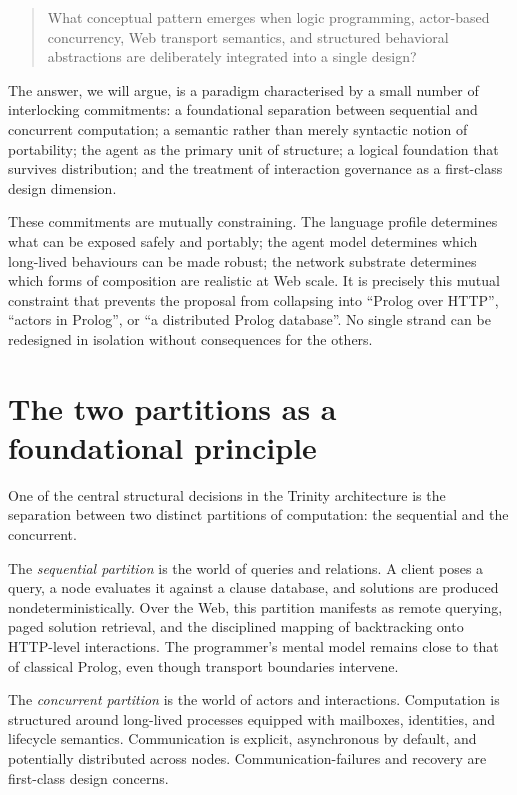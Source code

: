 \begin{quote}
\normalsize What conceptual pattern emerges when logic programming, actor-based concurrency, Web transport semantics, and structured behavioral abstractions are deliberately integrated into a single design?
\end{quote}

\noindent The answer, we will argue, is a paradigm characterised by a small number of interlocking commitments: a foundational separation between sequential and concurrent computation; a semantic rather than merely syntactic notion of portability; the agent as the primary unit of structure; a logical foundation that survives distribution; and the treatment of interaction governance as a first-class design dimension.

These commitments are mutually constraining. The language profile determines what can be exposed safely and portably; the agent model determines which long-lived behaviours can be made robust; the network substrate determines which forms of composition are realistic at Web scale. It is precisely this mutual constraint that prevents the proposal from collapsing into ``Prolog over HTTP'', ``actors in Prolog'', or ``a distributed Prolog database''. No single strand can be redesigned in isolation without consequences for the others.


\section{The two partitions as a foundational principle}\label{sec:two-partitions}

One of the central structural decisions in the Trinity architecture is
the separation between two distinct partitions of computation: the
sequential and the concurrent.

The \emph{sequential partition} is the world of queries and relations. A
client poses a query, a node evaluates it against a clause database, and
solutions are produced nondeterministically. Over the Web, this
partition manifests as remote querying, paged solution retrieval, and the
disciplined mapping of backtracking onto HTTP-level interactions. The
programmer's mental model remains close to that of classical Prolog,
even though transport boundaries intervene.

The \emph{concurrent partition} is the world of actors and interactions.
Computation is structured around long-lived processes equipped with
mailboxes, identities, and lifecycle semantics. Communication is
explicit, asynchronous by default, and potentially distributed across
nodes. Communication-failures and recovery are first-class design concerns.

